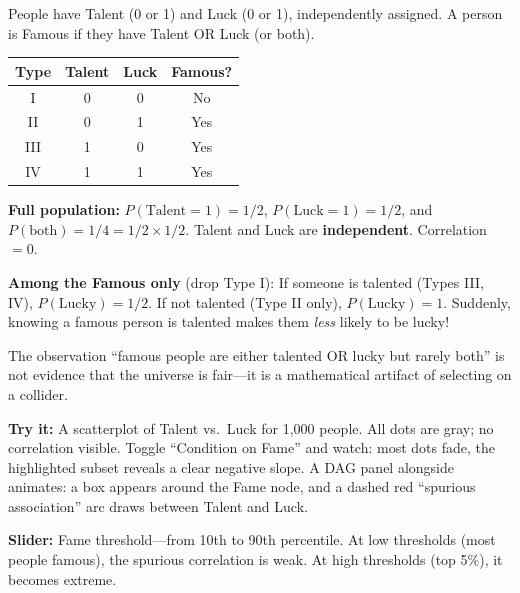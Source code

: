 \documentclass[11pt,a4paper]{article}
\theoremstyle{definition}
\theoremstyle{plain}
\theoremstyle{remark}
\begin{document}
\begin{numermark}[title={Talent, Luck, and the Fame Filter}]
People have Talent (0 or 1) and Luck (0 or 1), independently assigned. A person is Famous if they have Talent OR Luck (or both).

\begin{center}
\begin{tabular}{@{}cccc@{}}
\toprule
Type & Talent & Luck & Famous? \\
\midrule
I & 0 & 0 & No \\
II & 0 & 1 & Yes \\
III & 1 & 0 & Yes \\
IV & 1 & 1 & Yes \\
\bottomrule
\end{tabular}
\end{center}

\textbf{Full population:} $P(\text{Talent}=1) = 1/2$, $P(\text{Luck}=1) = 1/2$, and $P(\text{both}) = 1/4 = 1/2 \times 1/2$. Talent and Luck are \textbf{independent}. Correlation $= 0$.

\textbf{Among the Famous only} (drop Type I): If someone is talented (Types III, IV), $P(\text{Lucky}) = 1/2$. If not talented (Type II only), $P(\text{Lucky}) = 1$. Suddenly, knowing a famous person is talented makes them \emph{less} likely to be lucky!

The observation ``famous people are either talented OR lucky but rarely both'' is not evidence that the universe is fair---it is a mathematical artifact of selecting on a collider.
\end{numermark}

\begin{vizspec}[title={``The Paradox of Conditioning'' --- Collider Explorer}]
\textbf{Try it:} A scatterplot of Talent vs.\ Luck for 1{,}000 people. All dots are gray; no correlation visible. Toggle ``Condition on Fame'' and watch: most dots fade, the highlighted subset reveals a clear negative slope. A DAG panel alongside animates: a box appears around the Fame node, and a dashed red ``spurious association'' arc draws between Talent and Luck.

\textbf{Slider:} Fame threshold---from 10th to 90th percentile. At low thresholds (most people famous), the spurious correlation is weak. At high thresholds (top 5\%), it becomes extreme.
\end{vizspec}
\end{document}
